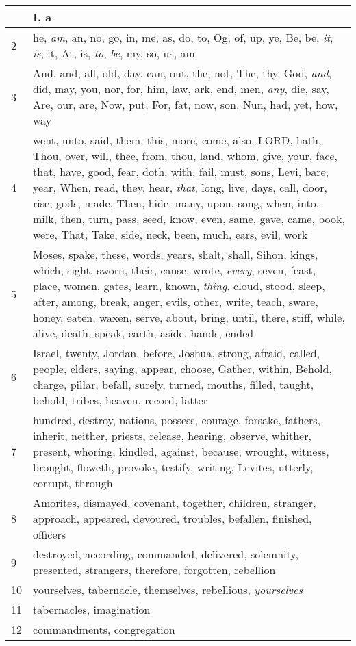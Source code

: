 \begin{longtable}{l|p{3.75in}}
\hline \hline
\endlastfoot
1 & I, a \\ \hline
2 & he, \emph{am}, an, no, go, in, me, as, do, to, Og, of, up, ye, Be, be, \emph{it}, \emph{is}, it, At, is, \emph{to}, \emph{be}, my, so, us, am \\ \hline
3 & And, and, all, old, day, can, out, the, not, The, thy, God, \emph{and}, did, may, you, nor, for, him, law, ark, end, men, \emph{any}, die, say, Are, our, are, Now, put, For, fat, now, son, Nun, had, yet, how, way \\ \hline
4 & went, unto, said, them, this, more, come, also, LORD, hath, Thou, over, will, thee, from, thou, land, whom, give, your, face, that, have, good, fear, doth, with, fail, must, sons, Levi, bare, year, When, read, they, hear, \emph{that}, long, live, days, call, door, rise, gods, made, Then, hide, many, upon, song, when, into, milk, then, turn, pass, seed, know, even, same, gave, came, book, were, That, Take, side, neck, been, much, ears, evil, work \\ \hline
5 & Moses, spake, these, words, years, shalt, shall, Sihon, kings, which, sight, sworn, their, cause, wrote, \emph{every}, seven, feast, place, women, gates, learn, known, \emph{thing}, cloud, stood, sleep, after, among, break, anger, evils, other, write, teach, sware, honey, eaten, waxen, serve, about, bring, until, there, stiff, while, alive, death, speak, earth, aside, hands, ended \\ \hline
6 & Israel, twenty, Jordan, before, Joshua, strong, afraid, called, people, elders, saying, appear, choose, Gather, within, Behold, charge, pillar, befall, surely, turned, mouths, filled, taught, behold, tribes, heaven, record, latter \\ \hline
7 & hundred, destroy, nations, possess, courage, forsake, fathers, inherit, neither, priests, release, hearing, observe, whither, present, whoring, kindled, against, because, wrought, witness, brought, floweth, provoke, testify, writing, Levites, utterly, corrupt, through \\ \hline
8 & Amorites, dismayed, covenant, together, children, stranger, approach, appeared, devoured, troubles, befallen, finished, officers \\ \hline
9 & destroyed, according, commanded, delivered, solemnity, presented, strangers, therefore, forgotten, rebellion \\ \hline
10 & yourselves, tabernacle, themselves, rebellious, \emph{yourselves} \\ \hline
11 & tabernacles, imagination \\ \hline
12 & commandments, congregation \\ \hline
\end{longtable}







